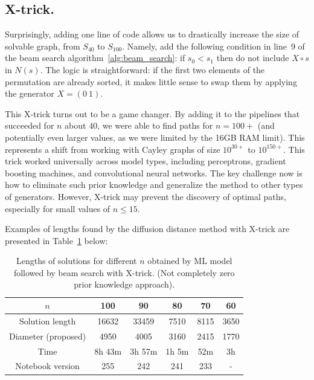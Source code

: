 \documentclass[reqno,11pt]{amsart}
\begin{document}
\subsection{X-trick.} Surprisingly, adding one line of code allows us to drastically increase the size of solvable graph, from $S_{40}$ to $S_{100}$. Namely, add the following condition in line~9 of the beam search algorithm~\ref{alg:beam_search}: if $s_0 < s_1$ then do not include $X\circ s$ in $N(s)$.
The logic is straightforward: if the first two elements of the permutation are already sorted, it makes little sense to swap them by applying the generator $X = (0 \ 1)$. 

This X-trick turns out to be a game changer. By adding it to the pipelines that succeeded for $n$ about $40$, we were able to find paths for $n=100+$ (and potentially even larger values, as we were limited by the 16GB RAM limit). This represents a shift from working with Cayley graphs of size $10^{30+}$ to $10^{150+}$.  This trick worked universally across model types, including perceptrons, gradient boosting machines, and convolutional neural networks. The key challenge now is how to eliminate such prior knowledge and generalize the method to other types of generators. However, X-trick may prevent the discovery of optimal paths, especially for small values of $n \le 15 $.


Examples of lengths found by the diffusion distance method with X-trick are presented
in Table~\ref{tab:lens_upto100} below:

\begin{table}[ht]
    \centering
    \begin{tabular}{|c|c|c|c|c|c|}
        \hline
        $n$   & 100 & 90   & 80  & 70 & 60  \\
        \hline
        Solution length        & 16632 & 33459  & 7510  & 8115 & 3650 \\
        \hline
        Diameter (proposed) &  4950   & 4005  & 3160  & 2415 & 1770 \\
        \hline
        Time         &  8h 43m & 3h 57m   & 1h 5m  & 52m & 3h  \\
        \hline
        Notebook version   &   255   &  242     & 241    & 233  & - \\
        \hline
    \end{tabular}
    \captionsetup{skip=10pt} 
    \caption{Lengths of solutions for different $n$ obtained by ML model followed by beam search with X-trick. (Not completely zero prior knowledge approach). }
    \label{tab:lens_upto100}
\end{table}
\end{document}
